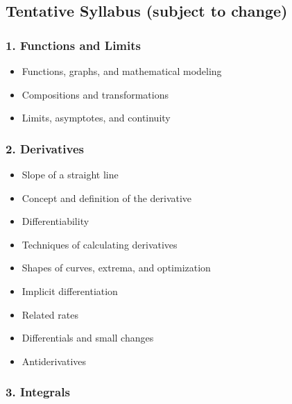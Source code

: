 \documentclass[
]{article}
\begin{document}
\hypertarget{tentative-syllabus-subject-to-change}{%
\subsection*{Tentative Syllabus (subject to change)}\label{tentative-syllabus-subject-to-change}}

\hypertarget{functions-and-limits}{%
\subsubsection*{1. Functions and Limits}\label{functions-and-limits}}

\begin{itemize}
\item
  Functions, graphs, and mathematical modeling
\item
  Compositions and transformations
\item
  Limits, asymptotes, and continuity
\end{itemize}

\hypertarget{derivatives}{%
\subsubsection*{2. Derivatives}\label{derivatives}}

\begin{itemize}
\item
  Slope of a straight line
\item
  Concept and definition of the derivative
\item
  Differentiability
\item
  Techniques of calculating derivatives
\item
  Shapes of curves, extrema, and optimization
\item
  Implicit differentiation
\item
  Related rates
\item
  Differentials and small changes
\item
  Antiderivatives
\end{itemize}

\hypertarget{integrals}{%
\subsubsection*{3. Integrals}\label{integrals}}
\end{document}
